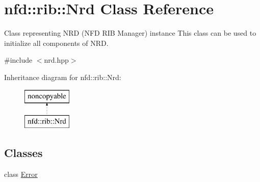 \hypertarget{classnfd_1_1rib_1_1Nrd}{}\section{nfd\+:\+:rib\+:\+:Nrd Class Reference}
\label{classnfd_1_1rib_1_1Nrd}


Class representing N\+RD (N\+FD R\+IB Manager) instance This class can be used to initialize all components of N\+RD.  




{\ttfamily \#include $<$nrd.\+hpp$>$}

Inheritance diagram for nfd\+:\+:rib\+:\+:Nrd\+:\begin{figure}[H]
\begin{center}
\leavevmode
\includegraphics[height=2.000000cm]{classnfd_1_1rib_1_1Nrd}
\end{center}
\end{figure}
\subsection*{Classes}
\begin{DoxyCompactItemize}
\item 
class \hyperlink{classnfd_1_1rib_1_1Nrd_1_1Error}{Error}
\end{DoxyCompactItemize}
